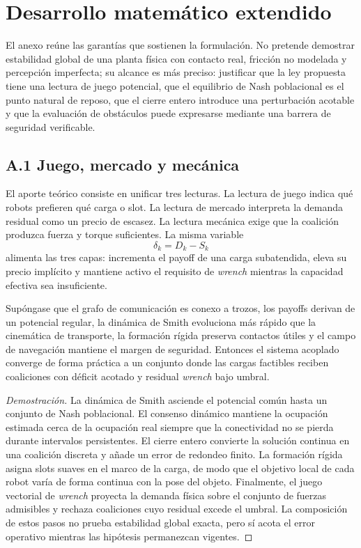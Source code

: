 \section{Desarrollo matemático extendido}

El anexo reúne las garantías que sostienen la formulación. No pretende demostrar
estabilidad global de una planta física con contacto real, fricción no modelada y
percepción imperfecta; su alcance es más preciso: justificar que la ley propuesta tiene
una lectura de juego potencial, que el equilibrio de Nash poblacional es el punto natural
de reposo, que el cierre entero introduce una perturbación acotable y que la evaluación
de obstáculos puede expresarse mediante una barrera de seguridad verificable.

\subsection*{A.1 Juego, mercado y mecánica}

El aporte teórico consiste en unificar tres lecturas. La lectura de juego indica qué
robots prefieren qué carga o slot. La lectura de mercado interpreta la demanda residual
como un precio de escasez. La lectura mecánica exige que la coalición produzca fuerza y
torque suficientes. La misma variable
\[
  \delta_k=D_k-S_k
\]
alimenta las tres capas: incrementa el payoff de una carga subatendida, eleva su precio
implícito y mantiene activo el requisito de \emph{wrench} mientras la capacidad efectiva
sea insuficiente.

\begin{proposicion}
Supóngase que el grafo de comunicación es conexo a trozos, los payoffs derivan de un
potencial regular, la dinámica de Smith evoluciona más rápido que la cinemática de
transporte, la formación rígida preserva contactos útiles y el campo de navegación
mantiene el margen de seguridad. Entonces el sistema acoplado converge de forma práctica
a un conjunto donde las cargas factibles reciben coaliciones con déficit acotado y
residual \emph{wrench} bajo umbral.
\end{proposicion}

\begin{proof}[Demostración]
La dinámica de Smith asciende el potencial común hasta un conjunto de Nash poblacional.
El consenso dinámico mantiene la ocupación estimada cerca de la ocupación real siempre
que la conectividad no se pierda durante intervalos persistentes. El cierre entero
convierte la solución continua en una coalición discreta y añade un error de redondeo
finito. La formación rígida asigna slots suaves en el marco de la carga, de modo que el
objetivo local de cada robot varía de forma continua con la pose del objeto. Finalmente,
el juego vectorial de \emph{wrench} proyecta la demanda física sobre el conjunto de
fuerzas admisibles y rechaza coaliciones cuyo residual excede el umbral. La composición
de estos pasos no prueba estabilidad global exacta, pero sí acota el error operativo
mientras las hipótesis permanezcan vigentes.
\end{proof}

